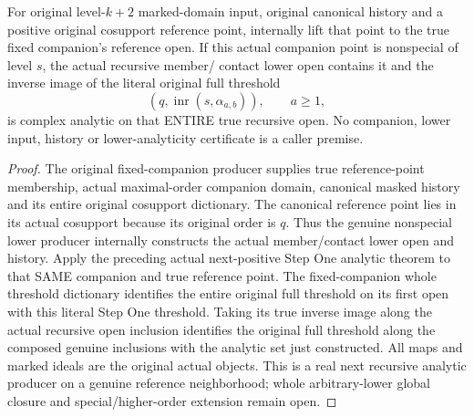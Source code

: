\begin{theorem}
\label{hir:original-frozen-companion-recursive-positive-analytic-consumer}
\leanok
{}
For original level-$k+2$ marked-domain input, original canonical history
and a positive original cosupport reference point, internally lift that
point to the true fixed companion's reference open. If this actual
companion point is nonspecial of level $s$, the actual recursive member/
contact lower open contains it and the inverse image of the literal
original full threshold
\[
 (q,\operatorname{inr}(s,\alpha_{a,b})),\qquad a\ge1,
\]
is complex analytic on that ENTIRE true recursive open. No companion,
lower input, history or lower-analyticity certificate is a caller premise.
\end{theorem}
\begin{proof}
The original fixed-companion producer supplies true reference-point
membership, actual maximal-order companion domain, canonical masked
history and its entire original cosupport dictionary. The canonical
reference point lies in its actual cosupport because its original order
is $q$. Thus the genuine nonspecial lower producer internally constructs
the actual member/contact lower open and history. Apply the preceding
actual next-positive Step One analytic theorem to that SAME companion
and true reference point. The fixed-companion whole threshold dictionary
identifies the entire original full threshold on its first open with
this literal Step One threshold. Taking its true inverse image along
the actual recursive open inclusion identifies the original full
threshold along the composed genuine inclusions with the analytic set
just constructed. All maps and marked ideals are the original actual
objects. This is a real next recursive analytic producer on a genuine
reference neighborhood; whole arbitrary-lower global closure and
special/higher-order extension remain open.
\end{proof}
